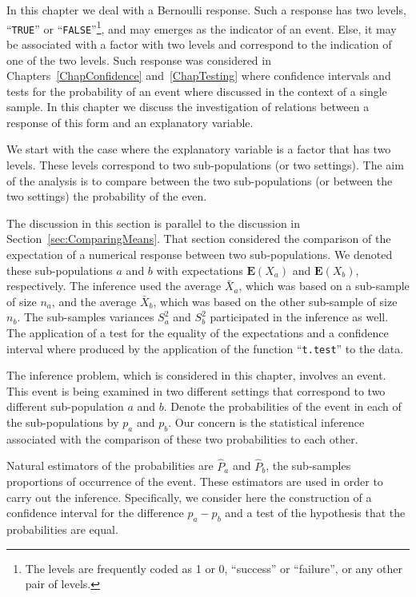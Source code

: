 \documentclass[]{krantz}
\newcommand{\Expec}{\mathbf{E}}
\theoremstyle{definition}
\theoremstyle{definition}
\theoremstyle{definition}
\theoremstyle{remark}
\begin{document}
In this chapter we deal with a Bernoulli response. Such a response has
two levels, ``\texttt{TRUE}'' or ``\texttt{FALSE}''\footnote{The levels are frequently coded as 1 or 0, ``success'' or ``failure'',
  or any other pair of levels.}, and may emerges as the indicator
of an event. Else, it may be associated with a factor with two levels
and correspond to the indication of one of the two levels. Such response
was considered in Chapters~\ref{ChapConfidence} and~\ref{ChapTesting} where
confidence intervals and tests for the probability of an event where
discussed in the context of a single sample. In this chapter we discuss
the investigation of relations between a response of this form and an
explanatory variable.

We start with the case where the explanatory variable is a factor that
has two levels. These levels correspond to two sub-populations (or two
settings). The aim of the analysis is to compare between the two
sub-populations (or between the two settings) the probability of the
even.

The discussion in this section is parallel to the discussion in
Section~\ref{sec:ComparingMeans}. That section considered the comparison of
the expectation of a numerical response between two sub-populations. We
denoted these sub-populations \(a\) and \(b\) with expectations
\(\Expec(X_a)\) and \(\Expec(X_b)\), respectively. The inference used the
average \(\bar X_a\), which was based on a sub-sample of size \(n_a\), and
the average \(\bar X_b\), which was based on the other sub-sample of size
\(n_b\). The sub-samples variances \(S^2_a\) and \(S^2_b\) participated in the
inference as well. The application of a test for the equality of the
expectations and a confidence interval where produced by the application
of the function ``\texttt{t.test}'' to the data.

The inference problem, which is considered in this chapter, involves an
event. This event is being examined in two different settings that
correspond to two different sub-population \(a\) and \(b\). Denote the
probabilities of the event in each of the sub-populations by \(p_a\) and
\(p_b\). Our concern is the statistical inference associated with the
comparison of these two probabilities to each other.

Natural estimators of the probabilities are \(\hat P_a\) and \(\hat P_b\),
the sub-samples proportions of occurrence of the event. These estimators
are used in order to carry out the inference. Specifically, we consider
here the construction of a confidence interval for the difference
\(p_a - p_b\) and a test of the hypothesis that the probabilities are
equal.
\end{document}
